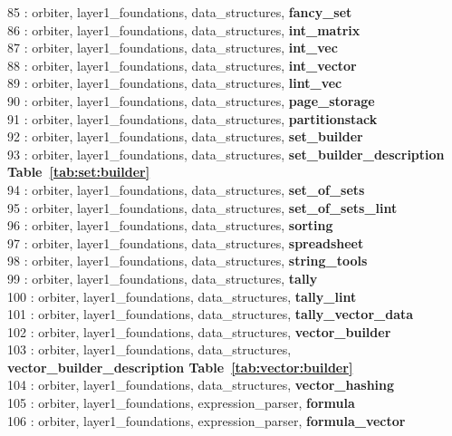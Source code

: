  85 : orbiter, layer1\_foundations, data\_structures, {\bf fancy\_set}\\
 86 : orbiter, layer1\_foundations, data\_structures, {\bf int\_matrix}\\
 87 : orbiter, layer1\_foundations, data\_structures, {\bf int\_vec}\\
 88 : orbiter, layer1\_foundations, data\_structures, {\bf int\_vector}\\
 89 : orbiter, layer1\_foundations, data\_structures, {\bf lint\_vec}\\
 90 : orbiter, layer1\_foundations, data\_structures, {\bf page\_storage}\\
 91 : orbiter, layer1\_foundations, data\_structures, {\bf partitionstack}\\
 92 : orbiter, layer1\_foundations, data\_structures, {\bf set\_builder}\\
 93 : orbiter, layer1\_foundations, data\_structures, {\bf set\_builder\_description Table~\ref{tab:set:builder}}\\
 94 : orbiter, layer1\_foundations, data\_structures, {\bf set\_of\_sets}\\
 95 : orbiter, layer1\_foundations, data\_structures, {\bf set\_of\_sets\_lint}\\
 96 : orbiter, layer1\_foundations, data\_structures, {\bf sorting}\\
 97 : orbiter, layer1\_foundations, data\_structures, {\bf spreadsheet}\\
 98 : orbiter, layer1\_foundations, data\_structures, {\bf string\_tools}\\
 99 : orbiter, layer1\_foundations, data\_structures, {\bf tally}\\
100 : orbiter, layer1\_foundations, data\_structures, {\bf tally\_lint}\\
101 : orbiter, layer1\_foundations, data\_structures, {\bf tally\_vector\_data}\\
102 : orbiter, layer1\_foundations, data\_structures, {\bf vector\_builder}\\
103 : orbiter, layer1\_foundations, data\_structures, {\bf vector\_builder\_description Table~\ref{tab:vector:builder}}\\
104 : orbiter, layer1\_foundations, data\_structures, {\bf vector\_hashing}\\
105 : orbiter, layer1\_foundations, expression\_parser, {\bf formula}\\
106 : orbiter, layer1\_foundations, expression\_parser, {\bf formula\_vector}\\
